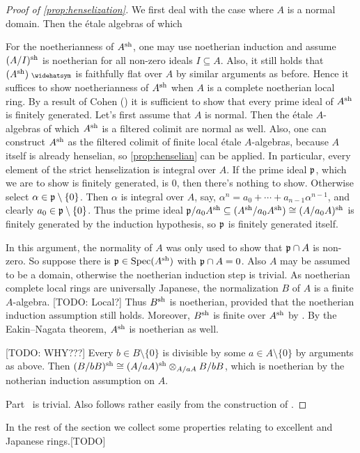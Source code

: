 \documentclass[a4paper, 10pt, oneside, DIV=9, chapterprefix=true, numbers=enddot, bibliography=totoc]{scrbook}
\begin{document}
\begin{proof}[Proof of \cref{prop:henselization}]
	 We first deal with the case where $A$ is a normal domain. Then the étale algebras of which 
	
	For the noetherianness of $A^{\mathrm{sh}}$, one may use noetherian induction and assume $(A/I)^{\mathrm{sh}}$ is noetherian for all non-zero ideals $I\subseteq A$. Also, it still holds that $(A^\sh)^\complete$ is faithfully flat over $A$ by similar arguments as before. Hence it suffices to show noetherianness of $A^{\mathrm{sh}}$ when $A$ is a complete noetherian local ring. By a result of Cohen (\cite[Theorem~3.4]{matsumuraCRT}) it is sufficient to show that every prime ideal of $A^{\mathrm{sh}}$ is finitely generated. Let's first assume that $A$ is normal. Then the étale $A$-algebras of which $A^{\mathrm{sh}}$ is a filtered colimit are normal as well. Also, one can construct $A^{\mathrm{sh}}$ as the filtered colimit of finite local étale $A$-algebras, because $A$ itself is already henselian, so \cref{prop:henselian} can be applied. In particular, every element of the strict henselization is integral over $A$. If the prime ideal $\mathfrak{p}$, which we are to show is finitely generated, is $0$, then there's nothing to show. Otherwise select $\alpha\in\mathfrak{p}\setminus\{0\}$. Then $\alpha$ is integral over $A$, say, $\alpha^n=a_0+\dotsb+a_{n-1}\alpha^{n-1}$, and clearly $a_0\in\mathfrak{p}\setminus \{0\}$. Thus the prime ideal $\mathfrak{p}/a_0A^{\mathrm{sh}}\subseteq (A^{\mathrm{sh}}/a_0A^{\mathrm{sh}})\cong(A/a_0A)^{\mathrm{sh}}$ is finitely generated by the induction hypothesis, so $\mathfrak{p}$ is finitely generated itself.
	
	In this argument, the normality of $A$ was only used to show that $\mathfrak{p}\cap A$ is non-zero. So suppose there is $\mathfrak{p}\in\operatorname{Spec}(A^{\mathrm{sh}})$ with $\mathfrak{p}\cap A=0$. Also $A$ may be assumed to be a domain, otherwise the noetherian induction step is trivial. As noetherian complete local rings are universally Japanese, the normalization $B$ of $A$ is a finite $A$-algebra. [TODO: Local?] Thus $B^{\mathrm{sh}}$ is noetherian, provided that the noetherian induction assumption still holds. Moreover, $B^{\mathrm{sh}}$ is finite over $A^{\mathrm{sh}}$ by . By the Eakin--Nagata theorem, $A^{\mathrm{sh}}$ is noetherian as well.
	
	[TODO: WHY???] Every $b\in B\setminus \{0\}$ is divisible by some $a\in A\setminus\{0\}$ by arguments as above. Then $(B/bB)^{\mathrm{sh}}\cong (A/aA)^{\mathrm{sh}}\otimes_{A/aA}B/bB$, which is noetherian by the notherian induction assumption on $A$.
	
	Part~ is trivial. Also  follows rather easily from the construction of .
\end{proof}
In the rest of the section we collect some properties relating to excellent and Japanese rings.[TODO]
\end{document}
